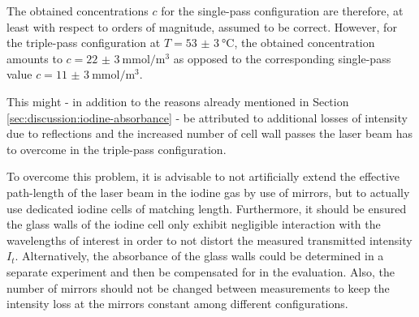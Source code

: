 The obtained concentrations $c$ for the single-pass configuration are therefore, at least with respect to orders of magnitude, assumed to be correct. However, for the triple-pass configuration at $T = \SI{53(3)}{\celsius}$, the obtained concentration amounts to $c = \SI{22(3)}{\milli\mol\per\m^3}$ as opposed to the corresponding single-pass value $c = \SI{11(3)}{\milli\mol\per\m^3}$.

This might - in addition to the reasons already mentioned in Section \ref{sec:discussion:iodine-absorbance} - be attributed to additional losses of intensity due to reflections and the increased number of cell wall passes the laser beam has to overcome in the triple-pass configuration.

To overcome this problem, it is advisable to not artificially extend the effective path-length of the laser beam in the iodine gas by use of mirrors, but to actually use dedicated iodine cells of matching length. Furthermore, it should be ensured the glass walls of the iodine cell only exhibit negligible interaction with the wavelengths of interest in order to not distort the measured transmitted intensity $I_t$. Alternatively, the absorbance of the glass walls could be determined in a separate experiment and then be compensated for in the evaluation. Also, the number of mirrors should not be changed between measurements to keep the intensity loss at the mirrors constant among different configurations.